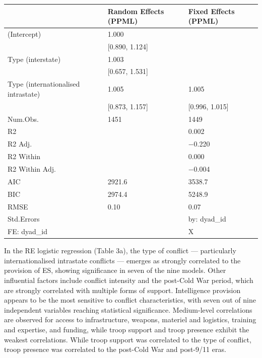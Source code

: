 \documentclass[
]{article}
\begin{document}
\begin{tabular}{lll}
\hline
& Random Effects (PPML) & Fixed Effects (PPML) \\ \hline
(Intercept) & \num{1.000} &  \\
& [\num{0.890}, \num{1.124}] &  \\
Type (interstate) & \num{1.003} &  \\
& [\num{0.657}, \num{1.531}] &  \\
Type (internationalised intrastate) & \num{1.005} & \num{1.005} \\
& [\num{0.873}, \num{1.157}] & [\num{0.996}, \num{1.015}] \\
Num.Obs. & \num{1451} & \num{1449} \\
R2 &  & \num{0.002} \\
R2 Adj. &  & \num{-0.220} \\
R2 Within &  & \num{0.000} \\
R2 Within Adj. &  & \num{-0.004} \\
AIC & \num{2921.6} & \num{3538.7} \\
BIC & \num{2974.4} & \num{5248.9} \\
RMSE & \num{0.10} & \num{0.07} \\
Std.Errors &  & by: dyad\_id \\
FE: dyad\_id &  & X \\
\hline
\end{tabular}

In the RE logistic regression (Table 3a), the type of conflict ---
particularly internationalised intrastate conflicts --- emerges as
strongly correlated to the provision of ES, showing significance in
seven of the nine models. Other influential factors include conflict
intensity and the post-Cold War period, which are strongly correlated
with multiple forms of support. Intelligence provision appears to be the
most sensitive to conflict characteristics, with seven out of nine
independent variables reaching statistical significance. Medium-level
correlations are observed for access to infrastructure, weapons,
materiel and logistics, training and expertise, and funding, while troop
support and troop presence exhibit the weakest correlations. While troop
support was correlated to the type of conflict, troop presence was
correlated to the post-Cold War and post-9/11 eras.
\end{document}

